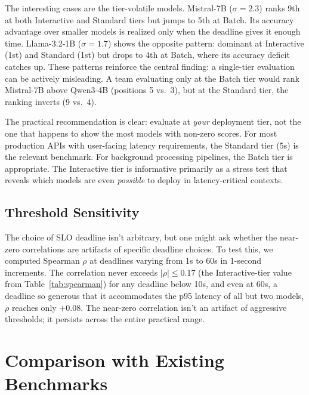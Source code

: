 \documentclass[11pt]{article}
\begin{document}
The interesting cases are the tier-volatile models.  Mistral-7B ($\sigma = 2.3$) ranks 9th at both Interactive and Standard tiers but jumps to 5th at Batch.  Its accuracy advantage over smaller models is realized only when the deadline gives it enough time.  Llama-3.2-1B ($\sigma = 1.7$) shows the opposite pattern: dominant at Interactive (1st) and Standard (1st) but drops to 4th at Batch, where its accuracy deficit catches up.  These patterns reinforce the central finding: a single-tier evaluation can be actively misleading.  A team evaluating only at the Batch tier would rank Mistral-7B above Qwen3-4B (positions 5 vs.\ 3), but at the Standard tier, the ranking inverts (9 vs.\ 4).

The practical recommendation is clear: evaluate at \emph{your} deployment tier, not the one that happens to show the most models with non-zero scores.  For most production APIs with user-facing latency requirements, the Standard tier (5s) is the relevant benchmark.  For background processing pipelines, the Batch tier is appropriate.  The Interactive tier is informative primarily as a stress test that reveals which models are even \emph{possible} to deploy in latency-critical contexts.

\subsection{Threshold Sensitivity}

The choice of SLO deadline isn't arbitrary, but one might ask whether the near-zero correlations are artifacts of specific deadline choices.  To test this, we computed Spearman $\rho$ at deadlines varying from 1s to 60s in 1-second increments.  The correlation never exceeds $|\rho| \leq 0.17$ (the Interactive-tier value from Table~\ref{tab:spearman}) for any deadline below 10s, and even at 60s, a deadline so generous that it accommodates the p95 latency of all but two models, $\rho$ reaches only $+0.08$.  The near-zero correlation isn't an artifact of aggressive thresholds; it persists across the entire practical range.

\section{Comparison with Existing Benchmarks}
\end{document}
